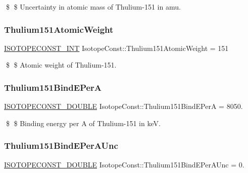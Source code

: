 \$ \$ Uncertainty in atomic mass of Thulium-\/151 in amu. \mbox{\label{group___isotope_const-_thulium-_tm151_ga5a2387244d03c09dcb2e2fed1b05c917}} 
\subsubsection{\texorpdfstring{Thulium151\+Atomic\+Weight}{Thulium151AtomicWeight}}
{\footnotesize\ttfamily \mbox{\hyperlink{group___isotope_const-_macros_ga5f18360b3e99483a35c32d789e62621c}{I\+S\+O\+T\+O\+P\+E\+C\+O\+N\+S\+T\+\_\+\+I\+NT}} Isotope\+Const\+::\+Thulium151\+Atomic\+Weight = 151}

\$ \$ Atomic weight of Thulium-\/151. \mbox{\label{group___isotope_const-_thulium-_tm151_ga9a4111d1e722e9c9e31905bfe407139b}} 
\subsubsection{\texorpdfstring{Thulium151\+Bind\+E\+PerA}{Thulium151BindEPerA}}
{\footnotesize\ttfamily \mbox{\hyperlink{group___isotope_const-_macros_ga8f45a7272ce02c0b4c65c44636ed719a}{I\+S\+O\+T\+O\+P\+E\+C\+O\+N\+S\+T\+\_\+\+D\+O\+U\+B\+LE}} Isotope\+Const\+::\+Thulium151\+Bind\+E\+PerA = 8050.}

\$ \$ Binding energy per A of Thulium-\/151 in keV. \mbox{\label{group___isotope_const-_thulium-_tm151_ga4a4ed68155cffebaa0acf73752713046}} 
\subsubsection{\texorpdfstring{Thulium151\+Bind\+E\+Per\+A\+Unc}{Thulium151BindEPerAUnc}}
{\footnotesize\ttfamily \mbox{\hyperlink{group___isotope_const-_macros_ga8f45a7272ce02c0b4c65c44636ed719a}{I\+S\+O\+T\+O\+P\+E\+C\+O\+N\+S\+T\+\_\+\+D\+O\+U\+B\+LE}} Isotope\+Const\+::\+Thulium151\+Bind\+E\+Per\+A\+Unc = 0.}

